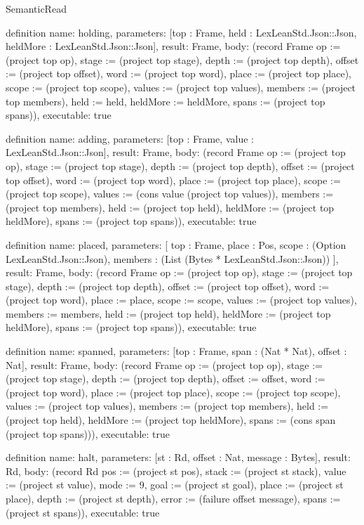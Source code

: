 \begin{lexlean}{SemanticRead}
\begin{semanticmodule}
definition{
  name: holding,
  parameters: [top : Frame, held : LexLeanStd.Json::Json, heldMore : LexLeanStd.Json::Json],
  result: Frame,
  body: (record Frame {op := (project top op), stage := (project top stage), depth := (project top depth), offset := (project top offset), word := (project top word), place := (project top place), scope := (project top scope), values := (project top values), members := (project top members), held := held, heldMore := heldMore, spans := (project top spans)}),
  executable: true
}

definition{
  name: adding,
  parameters: [top : Frame, value : LexLeanStd.Json::Json],
  result: Frame,
  body: (record Frame {op := (project top op), stage := (project top stage), depth := (project top depth), offset := (project top offset), word := (project top word), place := (project top place), scope := (project top scope), values := (cons value (project top values)), members := (project top members), held := (project top held), heldMore := (project top heldMore), spans := (project top spans)}),
  executable: true
}

definition{
  name: placed,
  parameters: [
    top : Frame,
    place : Pos,
    scope : (Option LexLeanStd.Json::Json),
    members : (List (Bytes * LexLeanStd.Json::Json))
  ],
  result: Frame,
  body: (record Frame {op := (project top op), stage := (project top stage), depth := (project top depth), offset := (project top offset), word := (project top word), place := place, scope := scope, values := (project top values), members := members, held := (project top held), heldMore := (project top heldMore), spans := (project top spans)}),
  executable: true
}

definition{
  name: spanned,
  parameters: [top : Frame, span : (Nat * Nat), offset : Nat],
  result: Frame,
  body: (record Frame {op := (project top op), stage := (project top stage), depth := (project top depth), offset := offset, word := (project top word), place := (project top place), scope := (project top scope), values := (project top values), members := (project top members), held := (project top held), heldMore := (project top heldMore), spans := (cons span (project top spans))}),
  executable: true
}

definition{
  name: halt,
  parameters: [st : Rd, offset : Nat, message : Bytes],
  result: Rd,
  body: (record Rd {pos := (project st pos), stack := (project st stack), value := (project st value), mode := 9, goal := (project st goal), place := (project st place), depth := (project st depth), error := (failure offset message), spans := (project st spans)}),
  executable: true
}


\end{semanticmodule}
\end{lexlean}

